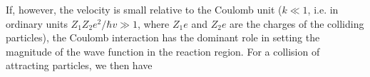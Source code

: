 If, however, the velocity is small relative to the Coulomb unit ($k\ll1$, i.e. in ordinary units $Z_1Z_2e^2/\hbar v\gg1$, where $Z_1e$ and $Z_2e$ are the charges of the colliding particles), the Coulomb interaction has the dominant role in setting the magnitude of the wave function in the reaction region. For a collision of attracting particles, we then have
